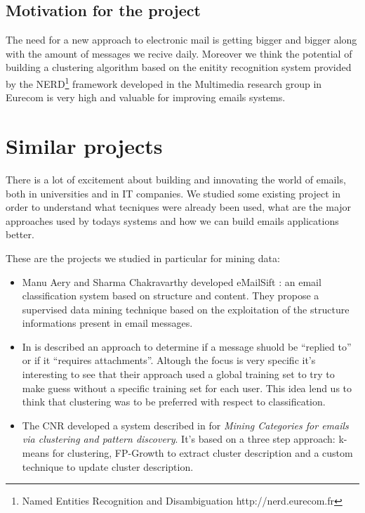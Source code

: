 \documentclass[a4paper,12pt]{report}
\begin{document}
\section*{Motivation for the project}

The need for a new approach to electronic mail is getting bigger and bigger along with the amount of messages we recive daily. Moreover we think the potential of building a clustering algorithm based on the enitity recognition system provided by the NERD\footnote{Named Entities Recognition and Disambiguation http://nerd.eurecom.fr} framework developed in the Multimedia research group in Eurecom is very high and valuable for improving emails systems.


\chapter{Similar projects}

There is a lot of excitement about building and innovating the world of emails, both in universities and in IT companies. We studied some existing project in order to understand what tecniques were already been used, what are the major approaches used by todays systems and how we can build emails applications better.


These are the projects we studied in particular for mining data:
\begin{itemize}
\item Manu Aery and Sharma Chakravarthy developed eMailSift \cite{Aery2005}: an email classification system based on structure and content. They propose a supervised data mining technique based on the exploitation of the structure informations present in email messages.
\item In \cite{Drezde2008} is described an approach to determine if a message shuold be ``replied to'' or if it ``requires attachments''. Altough the focus is very specific it's interesting to see that their approach used a global training set to try to make guess without a specific training set for each user. This idea lend us to think that clustering was to be preferred with respect to classification.
\item The CNR developed a system described in \cite{Manco2008} for \emph{Mining Categories for emails via clustering and pattern discovery}. It's based on a three step approach: k-means for clustering, FP-Growth to extract cluster description and a custom technique to update cluster description.
\end{itemize}
\end{document}
